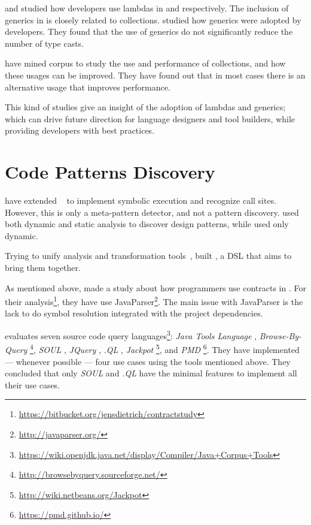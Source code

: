 \cite{mazinanianUnderstandingUseLambda2017} and \cite{uesbeckEmpiricalStudyImpact2016} studied how developers use lambdas in \java{} and \cpp{} respectively.
The inclusion of generics in \java{} is closely related to collections. 
\cite{parninJavaGenericsAdoption2011,parninAdoptionUseJava2013} studied how generics were adopted by \java{} developers.
They found that the use of generics do not significantly reduce the number of type casts.

\cite{costaEmpiricalStudyUsage2017} have mined \github{} corpus to study the use and performance of collections, and how these usages can be improved.
They have found out that in most cases there is an alternative usage that improves performance.

This kind of studies give an insight of the adoption of lambdas and generics; which can drive future direction for language designers and tool builders, while providing developers with best practices.

\section{Code Patterns Discovery}
\label{sec:lr:patterns}

\cite{posnettTHEXMiningMetapatterns2010} have extended \asm{}~\cite{brunetonASMCodeManipulation2002,kuleshovUsingASMFramework2007} to implement symbolic execution and recognize call sites.
However, this is only a meta-pattern detector, and not a pattern discovery.
\cite{huDynamicAnalysisDesign2008} used both dynamic and static analysis to discover design patterns, while \cite{arcelliDesignPatternDetection2008} used only dynamic.

Trying to unify analysis and transformation tools~\cite{vinjuHowMakeBridge2006}, \cite{klintRASCALDomainSpecific2009} built \rascal, a DSL that aims to bring them together.

As mentioned above, \cite{dietrichContractsWildStudy2017a} made a study about how programmers use contracts in \mavencentral{}.
For their analysis\footnote{\url{https://bitbucket.org/jensdietrich/contractstudy}}, they have use JavaParser\footnote{\url{http://javaparser.org/}}.
The main issue with JavaParser is the lack to do symbol resolution integrated with the project dependencies.

\cite{urmaProgrammingLanguageEvolution2012} evaluates seven source code query languages\footnote{\url{https://wiki.openjdk.java.net/display/Compiler/Java+Corpus+Tools}}:
\emph{Java Tools Language} \cite{cohenJTLJavaTools},
\emph{Browse-By-Query} \footnote{\url{http://browsebyquery.sourceforge.net/}},
\emph{SOUL} \cite{derooverSOULToolSuite2011},
\emph{JQuery} \cite{volderJqueryGenericCode2006},
\emph{.QL} \cite{moorKeynoteAddressQL2007},
\emph{Jackpot} \footnote{\url{http://wiki.netbeans.org/Jackpot}}, and
\emph{PMD} \footnote{\url{https://pmd.github.io/}}.
They have implemented --- whenever possible --- four use cases using the tools mentioned above.
They concluded that only \emph{SOUL} and \emph{.QL} have the minimal features to implement all their use cases.


